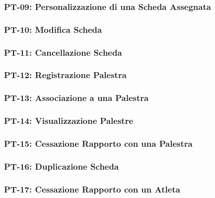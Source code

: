 \subsubsection{PT-09: Personalizzazione di una Scheda Assegnata}


\subsubsection{PT-10: Modifica Scheda}


\subsubsection{PT-11: Cancellazione Scheda}


\subsubsection{PT-12: Registrazione Palestra}


\subsubsection{PT-13: Associazione a una Palestra}


\subsubsection{PT-14: Visualizzazione Palestre}


\subsubsection{PT-15: Cessazione Rapporto con una Palestra}


\subsubsection{PT-16: Duplicazione Scheda}


\subsubsection{PT-17: Cessazione Rapporto con un Atleta}


